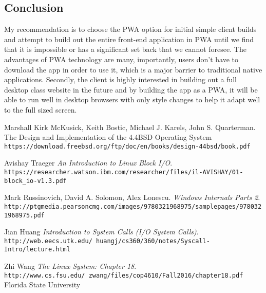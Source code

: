 \documentclass[titlepage,onecolumn]{article}
\begin{document}
\subsection{Conclusion}
My recommendation is to choose the PWA option for initial simple client builds and attempt to build out the entire front-end application in PWA until we find that it is impossible or has a significant set back that we cannot foresee. The advantages of PWA technology are many, importantly, users don't have to download the app in order to use it, which is a major barrier to traditional native applications. Secondly, the client is highly interested in building out a full desktop class website in the future and by building the app as a PWA, it will be able to run well in desktop browsers with only style changes to help it adapt well to the full sized screen.


  \newpage

  \begin{thebibliography}{5}

    Marshall Kirk McKusick, Keith Bostic, Michael J. Karels, John S. Quarterman.
    The Design and Implementation of the 4.4BSD Operating System
    \texttt{https://download.freebsd.org/ftp/doc/en/books/design-44bsd/book.pdf}
    \newline

    Avishay Traeger
    \textit{An Introduction to Linux Block I/O}.
    \texttt{https://researcher.watson.ibm.com/researcher/files/il-AVISHAY/01-block\_io-v1.3.pdf}

    Mark Russinovich, David A. Solomon, Alex Lonescu.
    \textit{Windows Internals Parts 2}.
    \texttt{http://ptgmedia.pearsoncmg.com/images/9780321968975/samplepages/9780321968975.pdf}

    Jian Huang
    \textit{Introduction to System Calls (I/O System Calls)}.
    \texttt{http://web.eecs.utk.edu/~huangj/cs360/360/notes/Syscall-Intro/lecture.html}

    Zhi Wang
    \textit{The Linux System: Chapter 18}.
    \texttt{http://www.cs.fsu.edu/~zwang/files/cop4610/Fall2016/chapter18.pdf}
    \newline
    Florida State University

  \end{thebibliography}
\end{document}
